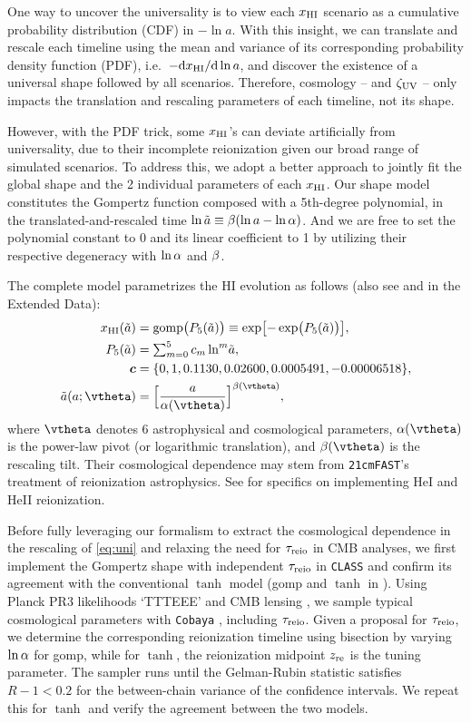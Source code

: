 One way to uncover the universality is to view each $x_{\mathrm{HI}}$ scenario as
a cumulative probability distribution (CDF) in $- \ln a$.
With this insight, we can translate and rescale each timeline using the
mean and variance of its corresponding probability density function
(PDF), i.e.\ $- \mathrm{d}x_{\mathrm{HI}} / \mathrm{d}\ln a$, and discover the
existence of a universal shape followed by all scenarios.
Therefore, cosmology -- and $\zeta_\mathrm{UV}$ -- only impacts 
the translation and rescaling parameters of each timeline, not its shape.

However, with the PDF trick, some $x_{\mathrm{HI}}$'s can deviate artificially
from universality, due to their incomplete reionization given our broad
range of simulated scenarios.
To address this, we adopt a better approach to jointly fit the global
shape and the 2 individual parameters of each $x_{\mathrm{HI}}$.
Our shape model constitutes the Gompertz function composed with a
5th-degree polynomial, in the translated-and-rescaled time $\ln\tilde{a}
\equiv \beta (\ln a - \ln\alpha)$.
And we are free to set the polynomial constant to 0 and its linear
coefficient to 1 by utilizing their respective degeneracy with $\ln\alpha$
and $\beta$.

The complete model parametrizes the HI evolution as follows (also see
 and  in the Extended Data):
%
\begin{align}
\label{eq:uni}
x_\HI(\ar) &= \gomp\bigl( P_5(\ar) \bigr)
  \equiv \exp\bigl[ - \exp\bigl( P_5(\ar) \bigr) \bigr], \\
%
\label{eq:poly}
P_5(\ar) &= {\textstyle\sum}_{m=0}^5 \, c_m \ln^m\!\ar, \\
%
\bm{c} &= \{0, 1, 0.1130, 0.02600, 0.0005491, -0.00006518\}, \nonumber\\
%
\label{eq:map}
\ar(a; \vtheta) &= \Bigl[ \frac{a}{\ap(\vtheta)} \Bigr]^{\tilt(\vtheta)},
\end{align}
%
where $\vtheta$ denotes 6 astrophysical and cosmological parameters,
$\ap(\vtheta)$ is the power-law pivot (or logarithmic translation), and
$\tilt(\vtheta)$ is the rescaling tilt.
Their cosmological dependence may stem from \texttt{21cmFAST}'s
treatment of reionization astrophysics.
See  for specifics on implementing HeI and HeII
reionization.

Before fully leveraging our formalism to extract the cosmological
dependence in the rescaling of \cref{eq:uni} and relaxing the
need for $\tau_{\mathrm{reio}}$ in CMB analyses, we first implement the Gompertz
shape with independent $\tau_{\mathrm{reio}}$ in \texttt{CLASS} and confirm its
agreement with the conventional $\tanh$ model (gomp and $\tanh$  in ).
Using Planck PR3 likelihoods `TTTEEE' \cite{Planck2020c} and CMB
lensing \cite{Planck2020d}, we sample typical cosmological parameters
with \texttt{Cobaya} \cite{Torrado2020}, including $\tau_{\mathrm{reio}}$. Given a proposal for
$\tau_{\mathrm{reio}}$, we determine the corresponding reionization timeline using bisection by varying
$\ln\alpha$ for gomp, while for $\tanh$,
the reionization midpoint $z_{\mathrm{re}}$ is the tuning parameter.
The sampler runs until the Gelman-Rubin statistic \cite{Gelman1992}
satisfies $R - 1 < 0.2$ for the between-chain variance of the confidence
intervals.
We repeat this for $\tanh$ and verify the agreement between the two models.

